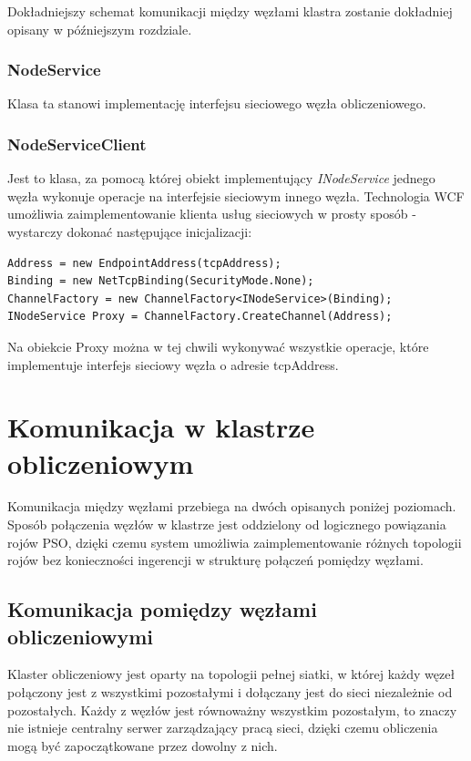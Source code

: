 \documentclass[12pt, twoside, openany, abstract=on]{report}
\theoremstyle{definition}
\begin{document}
Dokładniejszy schemat komunikacji między węzłami klastra zostanie dokładniej opisany w późniejszym rozdziale.

\subsubsection{NodeService}
Klasa ta stanowi implementację interfejsu sieciowego węzła obliczeniowego.

\subsubsection{NodeServiceClient}
Jest to klasa, za pomocą której obiekt implementujący \textit{INodeService} jednego węzła wykonuje operacje na interfejsie sieciowym innego węzła. Technologia WCF umożliwia zaimplementowanie klienta usług sieciowych w prosty sposób - wystarczy dokonać następujące inicjalizacji:

\begin{lstlisting}[frame=single]
Address = new EndpointAddress(tcpAddress);
Binding = new NetTcpBinding(SecurityMode.None);
ChannelFactory = new ChannelFactory<INodeService>(Binding);
INodeService Proxy = ChannelFactory.CreateChannel(Address);
\end{lstlisting}             

Na obiekcie Proxy można w tej chwili wykonywać wszystkie operacje, które implementuje interfejs sieciowy węzła o adresie tcpAddress.

\section{Komunikacja w klastrze obliczeniowym}
Komunikacja między węzłami przebiega na dwóch opisanych poniżej poziomach. Sposób połączenia węzłów w klastrze jest oddzielony od logicznego powiązania rojów PSO, dzięki czemu system umożliwia zaimplementowanie różnych topologii rojów bez konieczności ingerencji w strukturę połączeń pomiędzy węzłami.

\subsection{Komunikacja pomiędzy węzłami obliczeniowymi}
Klaster obliczeniowy jest oparty na topologii pełnej siatki, w której każdy węzeł połączony jest z wszystkimi pozostałymi i dołączany jest do sieci niezależnie od pozostałych. Każdy z węzłów jest równoważny wszystkim pozostałym, to znaczy nie istnieje centralny serwer zarządzający pracą sieci, dzięki czemu obliczenia mogą być zapoczątkowane przez dowolny z nich.
\end{document}
